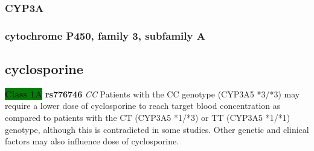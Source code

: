 \documentclass{book}
\begin{document}
\subsubsection{ CYP3A }
\subsubsection{ cytochrome P450, family 3, subfamily A }

\subsection{ cyclosporine }


\begin{center}



\textbf{\colorbox{green} {Class 1A}} \textbf{ rs776746 } \textit{ CC }
Patients with the CC genotype (CYP3A5 *3/*3) may require a lower dose of cyclosporine to reach target blood concentration as compared to patients with the CT (CYP3A5 *1/*3) or TT (CYP3A5 *1/*1) genotype, although this is contradicted in some studies. Other genetic and clinical factors may also influence dose of cyclosporine.

\end{center}
\end{document}
